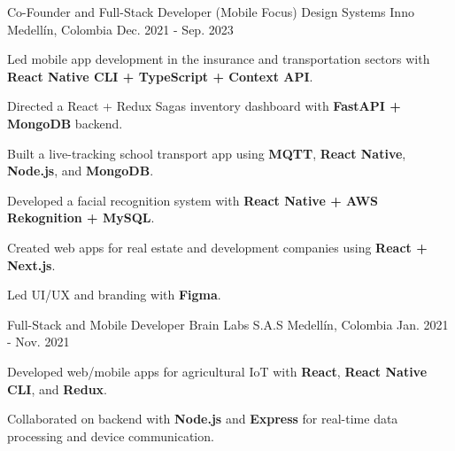 \begin{cventries}
\cventry
{Co-Founder and Full-Stack Developer (Mobile Focus)} %
{Design Systems Inno} %
{Medellín, Colombia} %
{Dec. 2021 - Sep. 2023} %
{
  \begin{cvitems}
    \item {Led mobile app development in the insurance and transportation sectors with \textbf{React Native CLI + TypeScript + Context API}.}
    \item {Directed a React + Redux Sagas inventory dashboard with \textbf{FastAPI + MongoDB} backend.}
    \item {Built a live-tracking school transport app using \textbf{MQTT}, \textbf{React Native}, \textbf{Node.js}, and \textbf{MongoDB}.}
    \item {Developed a facial recognition system with \textbf{React Native + AWS Rekognition + MySQL}.}
    \item {Created web apps for real estate and development companies using \textbf{React + Next.js}.}
    \item {Led UI/UX and branding with \textbf{Figma}.}
  \end{cvitems}
}

\cventry
{Full-Stack and Mobile Developer} %
{Brain Labs S.A.S} %
{Medellín, Colombia} %
{Jan. 2021 - Nov. 2021} %
{
  \begin{cvitems}
    \item {Developed web/mobile apps for agricultural IoT with \textbf{React}, \textbf{React Native CLI}, and \textbf{Redux}.}
    \item {Collaborated on backend with \textbf{Node.js} and \textbf{Express} for real-time data processing and device communication.}
  \end{cvitems}
}

\end{cventries}

